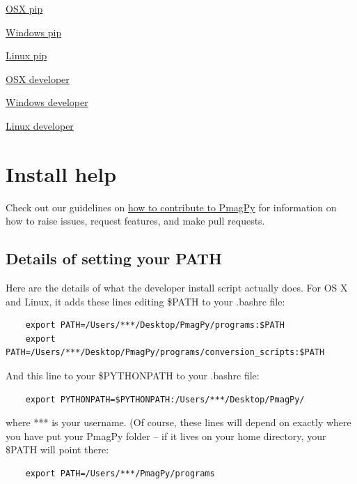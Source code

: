 \documentclass[11pt]{book}
\begin{document}
{\href{https://earthref.org/PmagPy/cookbook/osx_pip.html}{OSX pip}

\href{https://earthref.org/PmagPy/cookbook/windows_pip.html}{Windows pip}

\href{https://earthref.org/PmagPy/cookbook/linux_pip.html}{Linux pip}

\href{https://earthref.org/PmagPy/cookbook/osx_developer.html}{OSX developer}

\href{https://earthref.org/PmagPy/cookbook/windows_developer.html}{Windows developer}

\href{https://earthref.org/PmagPy/cookbook/linux_developer.html}{Linux developer}

\section{Install help}

Check out our guidelines on \href{https://github.com/PmagPy/PmagPy/blob/master/CONTRIBUTING.md}{how to contribute to PmagPy} for information on how to raise issues, request features, and make pull requests.


\subsection{Details of setting your PATH}
Here are the details of what the developer install script actually does.  For OS X and Linux, it adds these lines editing \$PATH to your .bashrc file:

\begin{verbatim}
    export PATH=/Users/***/Desktop/PmagPy/programs:$PATH
    export PATH=/Users/***/Desktop/PmagPy/programs/conversion_scripts:$PATH
\end{verbatim}

And this line to your \$PYTHONPATH to your .bashrc file:

\begin{verbatim}
    export PYTHONPATH=$PYTHONPATH:/Users/***/Desktop/PmagPy/
\end{verbatim}


where *** is your username.  (Of course, these lines will depend on exactly where you have put your PmagPy folder -- if it lives on your home directory, your \$PATH will point there:
\begin{verbatim}
    export PATH=/Users/***/PmagPy/programs
\end{verbatim}

}
\end{document}
